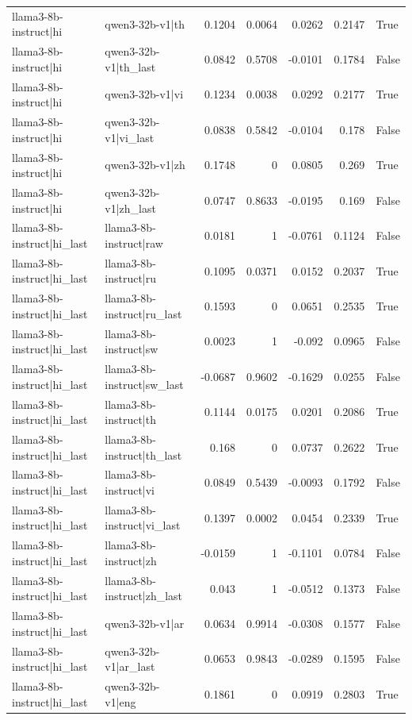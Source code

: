\begin{table}
\begin{tabular}{l l r r r r l}
llama3-8b-instruct|hi & qwen3-32b-v1|th & 0.1204 & 0.0064 & 0.0262 & 0.2147 & True \\
llama3-8b-instruct|hi & qwen3-32b-v1|th_last & 0.0842 & 0.5708 & -0.0101 & 0.1784 & False \\
llama3-8b-instruct|hi & qwen3-32b-v1|vi & 0.1234 & 0.0038 & 0.0292 & 0.2177 & True \\
llama3-8b-instruct|hi & qwen3-32b-v1|vi_last & 0.0838 & 0.5842 & -0.0104 & 0.178 & False \\
llama3-8b-instruct|hi & qwen3-32b-v1|zh & 0.1748 & 0 & 0.0805 & 0.269 & True \\
llama3-8b-instruct|hi & qwen3-32b-v1|zh_last & 0.0747 & 0.8633 & -0.0195 & 0.169 & False \\
llama3-8b-instruct|hi_last & llama3-8b-instruct|raw & 0.0181 & 1 & -0.0761 & 0.1124 & False \\
llama3-8b-instruct|hi_last & llama3-8b-instruct|ru & 0.1095 & 0.0371 & 0.0152 & 0.2037 & True \\
llama3-8b-instruct|hi_last & llama3-8b-instruct|ru_last & 0.1593 & 0 & 0.0651 & 0.2535 & True \\
llama3-8b-instruct|hi_last & llama3-8b-instruct|sw & 0.0023 & 1 & -0.092 & 0.0965 & False \\
llama3-8b-instruct|hi_last & llama3-8b-instruct|sw_last & -0.0687 & 0.9602 & -0.1629 & 0.0255 & False \\
llama3-8b-instruct|hi_last & llama3-8b-instruct|th & 0.1144 & 0.0175 & 0.0201 & 0.2086 & True \\
llama3-8b-instruct|hi_last & llama3-8b-instruct|th_last & 0.168 & 0 & 0.0737 & 0.2622 & True \\
llama3-8b-instruct|hi_last & llama3-8b-instruct|vi & 0.0849 & 0.5439 & -0.0093 & 0.1792 & False \\
llama3-8b-instruct|hi_last & llama3-8b-instruct|vi_last & 0.1397 & 0.0002 & 0.0454 & 0.2339 & True \\
llama3-8b-instruct|hi_last & llama3-8b-instruct|zh & -0.0159 & 1 & -0.1101 & 0.0784 & False \\
llama3-8b-instruct|hi_last & llama3-8b-instruct|zh_last & 0.043 & 1 & -0.0512 & 0.1373 & False \\
llama3-8b-instruct|hi_last & qwen3-32b-v1|ar & 0.0634 & 0.9914 & -0.0308 & 0.1577 & False \\
llama3-8b-instruct|hi_last & qwen3-32b-v1|ar_last & 0.0653 & 0.9843 & -0.0289 & 0.1595 & False \\
llama3-8b-instruct|hi_last & qwen3-32b-v1|eng & 0.1861 & 0 & 0.0919 & 0.2803 & True \\

\end{tabular}
\end{table}
